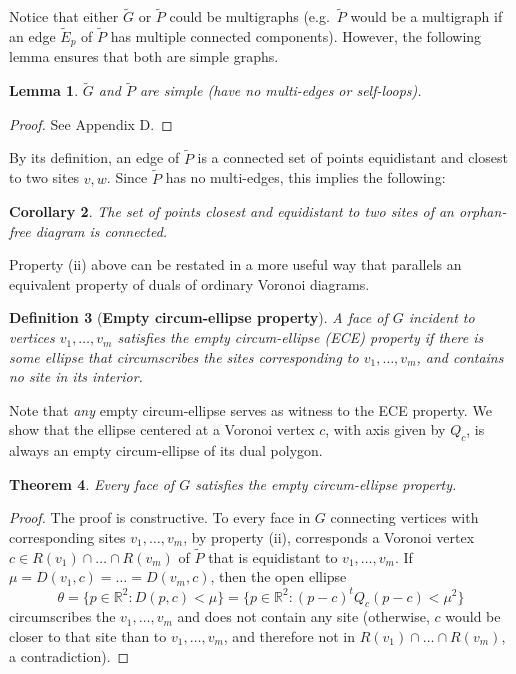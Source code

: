 \documentclass[11pt]{article}
\newtheorem{theorem}{Theorem}[section]
\newtheorem{lemma}[theorem]{Lemma}
\newtheorem{definition}[theorem]{Definition}
\newtheorem{corollary}[theorem]{Corollary}
\begin{document}
Notice that either $\tilde{G}$ or $\tilde{P}$ could be multigraphs (e.g.\ $\tilde{P}$ would be a multigraph if an edge $\tilde{E}_p$ of $\tilde{P}$ has multiple connected components). 
However, the following lemma ensures that both are simple graphs. 


\begin{lemma}\label{lem:simple}
$\tilde{G}$ and $\tilde{P}$ are simple (have no multi-edges or self-loops). \end{lemma}
\begin{proof}
See Appendix D. 
\end{proof}

By its definition, an edge of $\tilde{P}$ is a connected set of points equidistant
and closest to two sites $v,w$. Since $\tilde{P}$ has no multi-edges, this implies the following:


\begin{corollary}\label{cor:Pij}
The set of points closest and equidistant to two sites of an orphan-free diagram is connected. 
\end{corollary}





Property (ii) above can be restated in a more useful way that parallels an equivalent property of duals of ordinary Voronoi diagrams. 


\begin{definition}[{\bf Empty circum-ellipse property}]\label{def:ece}
	A face of $G$ incident to vertices $v_1,\dots,v_m$ satisfies the empty circum-ellipse (ECE) property if there is
\emph{some} ellipse that circumscribes the sites corresponding to $v_1,\dots,v_m$,
and contains no site  in its interior. 
\end{definition}

Note that \emph{any} empty circum-ellipse serves as witness to the ECE property. 
We show that the ellipse centered at a Voronoi vertex $c$, with axis given by $Q_c$, is always an empty circum-ellipse of its dual polygon.

\begin{theorem}\label{th:ece}
	Every face of $G$ satisfies the empty circum-ellipse property. 
\end{theorem}
\begin{proof}
The proof is constructive. 
To every face in $G$ connecting vertices with corresponding sites $v_1,\dots,v_m$, 
by property (ii), corresponds a Voronoi vertex
$c\in R(v_1)\cap\dots\cap R(v_m)$ of $\tilde{P}$ that is equidistant to $v_1,\dots,v_m$. 
If $\mu=D(v_1,c)=\dots=D(v_m,c)$,
then the open ellipse 
\[\theta=\{p\in\mathbb{R}^2 : D(p,c) < \mu\} = \{p\in\mathbb{R}^2 :
(p-c)^t Q_{c} (p-c) < \mu^2 \} \]
circumscribes the $v_1,\dots,v_m$ and does not contain any site (otherwise, $c$ would be closer to that site than to $v_1,\dots,v_m$, 
and therefore not in $R(v_1)\cap\dots\cap R(v_m)$, a contradiction). 
\end{proof}
\end{document}
